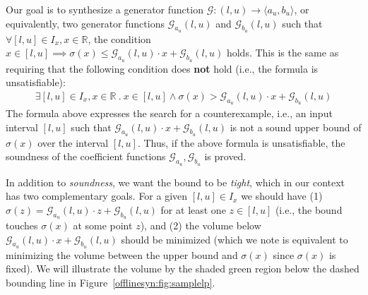 Our goal is to synthesize a generator function $\mathcal{G}:
(l,u)\to \langle a_u,b_u\rangle$, or equivalently, two generator
functions $\mathcal{G}_{a_u}(l,u)$ and $\mathcal{G}_{b_u}(l,u)$ such that
%
$\forall [l, u] \in I_x, x \in \mathbb{R}$, the condition $
  x \in [l, u] \implies  \sigma(x) \leq \mathcal{G}_{a_u}(l, u) \cdot x
  +\mathcal{G}_{b_u}(l,u)
$ holds.
%
This is the same as requiring that the following condition does
\textbf{not} hold (i.e., the formula is unsatisfiable):
%
\begin{gather*}\label{offlinesyn:eq:sound}
\exists [l, u] \in I_x, x \in \mathbb{R} ~.~ x \in [l, u] \wedge \sigma(x) >
\mathcal{G}_{a_u}(l, u) \cdot x +
\mathcal{G}_{b_u}(l,u)
\end{gather*}
The formula above expresses the search for a counterexample, i.e., an input interval $
[l, u] $ such that $ \mathcal{G}_{a_u}(l, u) \cdot x + \mathcal{G}_{b_u}(l, u)
$ is not a sound upper bound of $\sigma(x) $ over the interval $ [l, u] $.
%
Thus, if the above formula is unsatisfiable, the soundness of the coefficient
functions $ \mathcal{G}_{a_u}, \mathcal{G}_{b_u} $ is proved.
%

In addition to \textit{soundness}, we want the bound to be \textit{tight},
which in our context has two complementary goals.
%
For a given $ [l, u] \in I_x $ we should have (1) $
\sigma(z) = \mathcal{G}_{a_u}(l, u) \cdot z + \mathcal{G}_{b_u}(l, u) $ for at
least one $ z \in [l, u] $ (i.e., the bound touches $ \sigma(x) $ at
some point $ z $),
%
and (2) the volume below $ \mathcal{G}_{a_u}(l, u) \cdot x +
\mathcal{G}_{b_u}(l, u) $ should be minimized (which we note is equivalent to
minimizing the volume between the upper bound and $\sigma(x)$ since $\sigma(x)$ is fixed).
%
We will illustrate the volume by the shaded green region below the dashed
bounding line in Figure~\ref{offlinesyn:fig:samplelp}.


